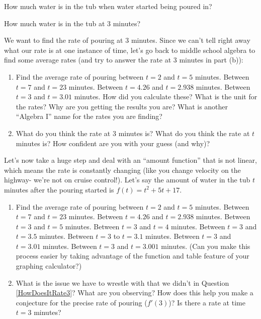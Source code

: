 \documentclass{ximera}
\begin{document}
\begin{question}
How much water is in the tub when water started being poured in?
\end{question}

\begin{question}
How much water is in the tub at 3 minutes?
\end{question}


\begin{question} \label{HowDoesItRate3}
We want to find the rate of pouring at $3$ minutes. Since we can't tell right away what our rate is at one instance of time, let's go back to middle school algebra to find some average rates (and try to answer the rate at 3 minutes in part (b)):
\begin{enumerate}
    \item Find the average rate of pouring between $t=2$ and $t=5$ minutes.  Between $t = 7$ and $t=23$ minutes.  Between $t=4.26$ and $t=2.938$ minutes.  Between $t=3$ and $t = 3.01$ minutes.  How did you calculate these?  What is the unit for the rates?  Why are you getting the results you are?  What is another ``Algebra I'' name for the rates you are finding?
    \item What do you think the rate at $3$ minutes is?  What do you think the rate at $t$ minutes is?  How confident are you with your guess (and why)?
\end{enumerate}
\end{question}


\begin{question} \label{HowDoesItRate4}
Let's now take a huge step and deal with an ``amount function'' that is not linear, which means the rate is constantly changing (like you change velocity on the highway- we're not on cruise control!).  Let's say the amount of water in the tub $t$ minutes after the pouring started is  $f(t) = t^2+5t+17$. 
\begin{enumerate} 
\item    Find the average rate of pouring between $t=2$ and $t=5$ minutes.  Between $t = 7$ and $t=23$ minutes.  Between $t=4.26$ and $t=2.938$ minutes.  Between $t=3$ and $t=5$ minutes.  Between $t=3$ and $t=4$ minutes.  Between $t=3$ and $t=3.5$ minutes.  Between $t=3$ to $t=3.1$ minutes.  Between $t=3$ and $t=3.01$ minutes.  Between $t=3$ and $t=3.001$ minutes.  (Can you make this process easier by taking advantage of the function and table feature of your graphing calculator?)
\item     What is the issue we have to wrestle with that we didn't in Question \ref{HowDoesItRate3}?  What are you observing?  How does this help you make a conjecture for the precise rate of pouring ($f'(3)$)? Is there a rate at time $t=3$ minutes?
     \end{enumerate}
\end{question}
\end{document}

